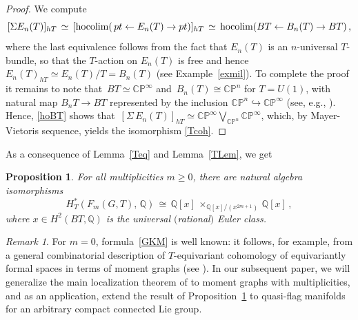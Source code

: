 \documentclass[11pt]{amsart}
\newtheorem{prop}[theorem]{Proposition}
\theoremstyle{definition}
\theoremstyle{remark}
\newtheorem{remark}[theorem]{Remark}
\numberwithin{equation}{section}
\newcommand{\la}{\label}
\newcommand{\hocolim}{\mathrm{hocolim}}
\newcommand{\into}{\hookrightarrow}
\def\bP{\mathbb P}
\def\C{\mathbb C}
\def\Q{\mathbb{Q}}
\begin{document}
\begin{proof}
We compute
\begin{equation}
\la{hoBT}
[\Sigma E_n(T)]_{hT} \, \simeq\,  [\hocolim(\,{\rm pt} \leftarrow E_{n}(T) \to 
{\rm pt})]_{hT}  \,\simeq \, \hocolim(BT \leftarrow B_{n}(T) \to BT)\,,
\end{equation}
%
%
where the last equivalence follows from the fact that $ E_n(T)$ is an $n$-universal $T$-bundle, 
so that the $T$-action on $E_{n}(T) $ is free and hence $ E_{n}(T)_{hT} \simeq E_{n}(T)/T = B_{n}(T)$ (see Example~\ref{exmil}). To complete the proof it remains to note that 
$\, BT \simeq \C\bP^\infty $ and $\, B_{n}(T) \cong \C\bP^{n} $ for $T = U(1) $, with  natural map $ B_{n}T \to BT $ represented by the inclusion $ \C\bP^{n} \into 
\C\bP^{\infty}$ (see, e.g., \cite[Example 9.2.3]{Se97}). Hence, \eqref{hoBT} shows that
$\,[\Sigma\, E_n(T)]_{hT} \simeq \C\bP^\infty \bigvee_{\C\bP^n} \C\bP^{\infty} $, which, by Mayer-Vietoris
sequence, yields the isomorphism \eqref{Tcoh}.
\end{proof}
%
As a consequence of Lemma~\ref{Teq} and Lemma~\ref{TLem}, we get
%
\begin{prop}
\la{PTcoh}
For all multiplicities $ m \ge 0 $, there are natural algebra isomorphisms 
%
\begin{equation}
\la{GKM}
H_{T}^*(F_m(G,T),\,\Q)\,\cong\, \Q[x]\,\times_{\Q[x]/(x^{2m+1})}\,\Q[x]\,,
\end{equation}
%
where $ x \in H^2(BT, \Q) $ is the universal $($rational$)$ Euler class.
\end{prop}
%

%
\begin{remark}
\la{ReGKM}
For $m=0$, formula~\eqref{GKM} is well known: it follows, for example, from a general combinatorial description of $T$-equivariant cohomology of equivariantly formal spaces in terms of moment graphs 
(see \cite{GKM98}). In our subsequent paper, we will generalize the main localization 
theorem of \cite{GKM98} to moment graphs with multiplicities, and as an application,
extend the result of Proposition~\ref{PTcoh} to quasi-flag manifolds for an arbitrary compact connected Lie group. 
\end{remark}
%
\end{document}

